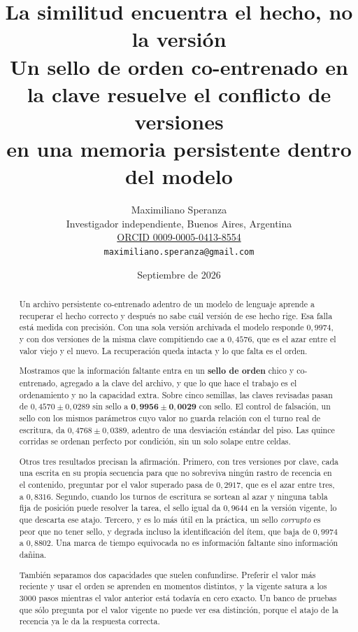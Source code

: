 \documentclass[11pt,a4paper]{article}
\title{\bfseries La similitud encuentra el hecho, no la versión\\
\large Un sello de orden co-entrenado en la clave resuelve el conflicto de versiones\\
en una memoria persistente dentro del modelo}
\author{Maximiliano Speranza\\
\small Investigador independiente, Buenos Aires, Argentina\\
\small \href{https://orcid.org/0009-0005-0413-8554}{ORCID 0009-0005-0413-8554}\\
\small \texttt{maximiliano.speranza@gmail.com}}
\date{Septiembre de 2026}
\begin{document}
\maketitle

\begin{abstract}
\noindent
Un archivo persistente co-entrenado adentro de un modelo de lenguaje aprende a recuperar el hecho
correcto y después no sabe cuál versión de ese hecho rige. Esa falla está medida con precisión. Con
una sola versión archivada el modelo responde $0{,}9974$, y con dos versiones de la misma clave
compitiendo cae a $0{,}4576$, que es el azar entre el valor viejo y el nuevo. La recuperación queda
intacta y lo que falta es el orden.

Mostramos que la información faltante entra en un \textbf{sello de orden} chico y co-entrenado,
agregado a la clave del archivo, y que lo que hace el trabajo es el ordenamiento y no la capacidad
extra. Sobre cinco semillas, las claves revisadas pasan de $0{,}4570 \pm 0{,}0289$ sin sello a
$\mathbf{0{,}9956 \pm 0{,}0029}$ con sello. El control de falsación, un sello con los mismos
parámetros cuyo valor no guarda relación con el turno real de escritura, da $0{,}4768 \pm 0{,}0389$,
adentro de una desviación estándar del piso. Las quince corridas se ordenan perfecto por condición,
sin un solo solape entre celdas.

Otros tres resultados precisan la afirmación. Primero, con tres versiones por clave, cada una escrita
en su propia secuencia para que no sobreviva ningún rastro de recencia en el contenido, preguntar por
el valor superado pasa de $0{,}2917$, que es el azar entre tres, a $0{,}8316$. Segundo, cuando los
turnos de escritura se sortean al azar y ninguna tabla fija de posición puede resolver la tarea, el
sello igual da $0{,}9644$ en la versión vigente, lo que descarta ese atajo. Tercero, y es lo más útil
en la práctica, un sello \emph{corrupto} es peor que no tener sello, y degrada incluso la
identificación del ítem, que baja de $0{,}9974$ a $0{,}8802$. Una marca de tiempo equivocada no es
información faltante sino información dañina.

También separamos dos capacidades que suelen confundirse. Preferir el valor más reciente y usar el
orden se aprenden en momentos distintos, y la vigente satura a los $3000$ pasos mientras el valor
anterior está todavía en cero exacto. Un banco de pruebas que sólo pregunta por el valor vigente no
puede ver esa distinción, porque el atajo de la recencia ya le da la respuesta correcta.
\end{abstract}
\end{document}
